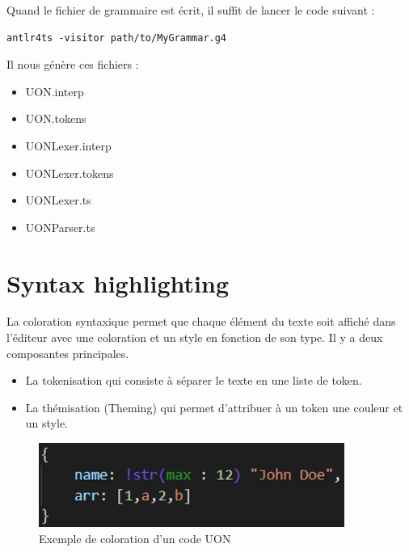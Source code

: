 \documentclass[
    iict, %
    il, %
]{heig-tb}
\begin{document}
Quand le fichier de grammaire est écrit, il suffit de lancer le code suivant :

\begin{lstlisting}[frame=single]
    antlr4ts -visitor path/to/MyGrammar.g4
\end{lstlisting}

Il nous génère ces fichiers :
\begin{itemize}
    \item UON.interp
    \item UON.tokens
    \item UONLexer.interp
    \item UONLexer.tokens
    \item UONLexer.ts
    \item UONParser.ts
\end{itemize}

\section{Syntax highlighting}



La coloration syntaxique permet que chaque élément du texte soit affiché dans l'éditeur avec une coloration et un style en fonction de son type.
Il y a deux composantes principales.
\begin{itemize}
    \item La tokenisation qui consiste à séparer le texte en une liste de token.
    \item La thémisation (Theming) qui permet d'attribuer à un token une couleur et un style.
\end{itemize}

\begin{figure}[!h]
    \begin{center}
        \includegraphics[width=10cm]{assets/figures/example-uon-coloration.png}
    \end{center}
    \caption[Exemple de coloration d'un code UON]{\label{example-uon-coloration} Exemple de coloration d'un code UON}
\end{figure}
\end{document}
